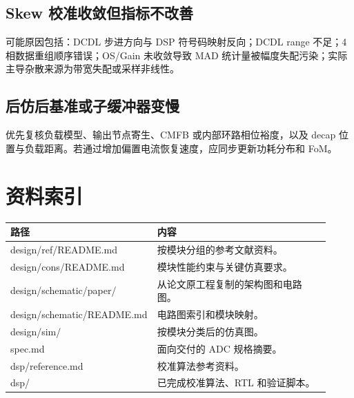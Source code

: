 \documentclass[UTF8,zihao=-4]{ctexart}
\begin{document}
\subsection{Skew 校准收敛但指标不改善}

可能原因包括：DCDL 步进方向与 DSP 符号码映射反向；DCDL range 不足；4 相数据重组顺序错误；OS/Gain 未收敛导致 MAD 统计量被幅度失配污染；实际主导杂散来源为带宽失配或采样非线性。

\subsection{后仿后基准或子缓冲器变慢}

优先复核负载模型、输出节点寄生、CMFB 或内部环路相位裕度，以及 decap 位置与负载距离。若通过增加偏置电流恢复速度，应同步更新功耗分布和 FoM。

\section{资料索引}

\begin{longtable}{>{\ttfamily}p{0.38\linewidth}p{0.54\linewidth}}
\toprule
路径 & 内容 \\
\midrule
\endhead
design/ref/README.md & 按模块分组的参考文献资料。\\
design/cons/README.md & 模块性能约束与关键仿真要求。\\
design/schematic/paper/ & 从论文原工程复制的架构图和电路图。\\
design/schematic/README.md & 电路图索引和模块映射。\\
design/sim/ & 按模块分类后的仿真图。\\
spec.md & 面向交付的 ADC 规格摘要。\\
dsp/reference.md & 校准算法参考资料。\\
dsp/ & 已完成校准算法、RTL 和验证脚本。\\
\bottomrule
\end{longtable}
\end{document}
